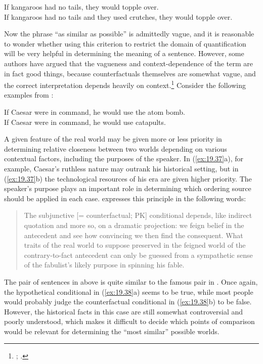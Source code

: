 \ea \label{ex:19.36}
\ea  If kangaroos had no tails, they would topple over.\\
\ex If kangaroos had no tails and they used crutches, they would topple over.
                       \z
\z


Now the phrase “as similar as possible” is admittedly vague, and it is reasonable to wonder whether using this criterion to restrict the domain of quantification will be very helpful in determining the meaning of a sentence. However, some authors have argued that the vagueness and context-dependence of the term are in fact good things, because counterfactuals themselves are somewhat vague, and the correct interpretation depends heavily on context.\footnote{\citet[91ff]{Lewis1973a}; \citet{vonFintel2012}.} Consider the following examples from \citet[221]{Quine1960}:


\ea \label{ex:19.37}
\ea  If Caesar were in command, he would use the atom bomb.\\
\ex If Caesar were in command, he would use catapults.
                       \z
\z


A given feature of the real world may be given more or less priority in determining relative closeness between two worlds depending on various contextual factors, including the purposes of the speaker. In (\ref{ex:19.37}a), for example, Caesar’s ruthless nature may outrank his historical setting, but in (\ref{ex:19.37}b) the technological resources of his era are given higher priority. The speaker’s purpose plays an important role in determining which ordering source should be applied in each case. \citet[221]{Quine1960} expresses this principle in the following words:


\begin{quote}
The subjunctive [= counterfactual; PK] conditional depends, like indirect quotation and more so, on a dramatic projection: we feign belief in the antecedent and see how convincing we then find the consequent. What traits of the real world to suppose preserved in the feigned world of the contrary-to-fact antecedent can only be guessed from a sympathetic sense of the fabulist’s likely purpose in spinning his fable.
\end{quote}


The pair of sentences in  above is quite similar to the famous pair in . Once again, the hypothetical conditional in (\ref{ex:19.38}a) seems to be true, while most people would probably judge the counterfactual conditional in (\ref{ex:19.38}b) to be false. However, the historical facts in this case are still somewhat controversial and poorly understood, which makes it difficult to decide which points of comparison would be relevant for determining the “most similar” possible worlds.


